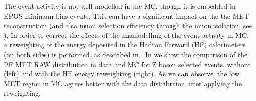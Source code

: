 The event activity is not well modelled in the MC, though it is embedded in EPOS minimum bias events. This can have a significant impact on the the MET reconstruction (and also muon selection efficiency through the muon isolation, see ). In order to correct the effects of the mismodelling of the event activity in MC, a reweighting of the energy deposited in the Hadron Forward (HF) calorimeters (on both sides) is performed, as described in . In  we show the comparison of the PF MET RAW distribution in data and MC for Z boson selected events, without (left) and with the HF energy reweighting (right). As we can observe, the low MET region in MC agrees better with the data distribution after applying the reweighting.

